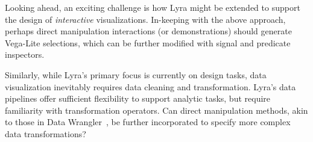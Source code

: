 Looking ahead, an exciting challenge is how Lyra might be extended to support
the design of \emph{interactive} visualizations. In-keeping with the above
approach, perhaps direct manipulation interactions (or demonstrations) should
generate Vega-Lite selections, which can be further modified with signal and
predicate inspectors.

Similarly, while Lyra's primary focus is currently on design tasks, data
visualization inevitably requires data cleaning and transformation. Lyra's data
pipelines offer sufficient flexibility to support analytic tasks, but require
familiarity with transformation operators. Can direct manipulation methods, akin
to those in Data Wrangler~\cite{kandel:wrangler}, be further incorporated to
specify more complex data transformations?